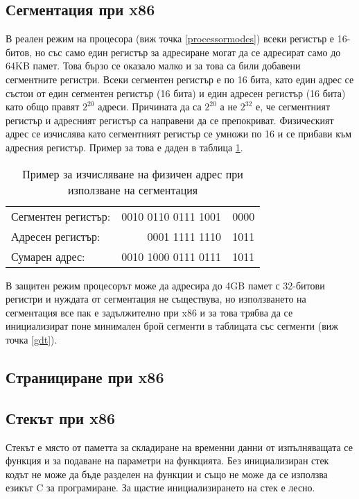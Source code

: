   \subsection{Сегментация при x86} \label{segmentation}
  В реален режим на процесора (виж точка \ref{processormodes}) всеки регистър е 16-битов, но със само един регистър за адресиране могат да се адресират само до 64KB памет. Това бързо се оказало малко и за това са били добавени сегментните регистри. Всеки сегментен регистър е по 16 бита, като един адрес се състои от един сегментен регистър (16 бита) и един адресен регистър (16 бита) като общо правят $2^{20}$ адреси. Причината да са $2^{20}$ а не $2^{32}$ е, че сегментният регистър и адресният регистър са направени да се препокриват. Физическият адрес се изчислява като сегментният регистър се умножи по 16 и се прибави към адресния регистър. Пример за това е даден в таблица \ref{tab:segmentation-calculation}.
  \begin{table}[ht]
    \centering
    \begin{tabular}{l r@{\hskip 3pt}l}
      Сегментен регистър: & 0010 0110 0111 1001 & \color{gray}0000 \\
      Адресен регистър: & 0001 1111 1110 & 1011 \\
      \hline
      Сумарен адрес: & 0010 1000 0111 0111 & 1011 \\
    \end{tabular}
    \caption{Пример за изчисляване на физичен адрес при използване на сегментация}
    \label{tab:segmentation-calculation}
  \end{table}

  В защитен режим процесорът може да адресира до 4GB памет с 32-битови регистри и нуждата от сегментация не съществува, но използването на сегментация все пак е задължително при x86 и за това трябва да се инициализират поне минимален брой сегменти в таблицата със сегменти (виж точка \ref{gdt}).

  \subsection{Странициране при x86}

  \subsection{Стекът при x86}
  Стекът е място от паметта за складиране на временни данни от изпълняващата се функция и за подаване на параметри на функцията. Без инициализиран стек кодът не може да бъде разделен на функции и също не може да се използва езикът C за програмиране. За щастие инициализирането на стек е лесно.

